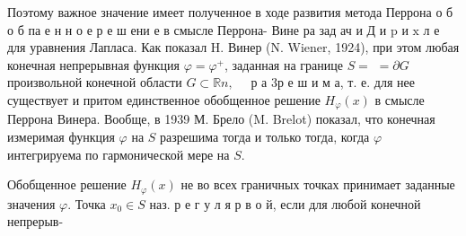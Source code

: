 \documentclass[10pt]{article}
\begin{document}
Поэтому важное значение имеет полученное в ходе развития метода Перрона о б о б па е н н о е р е ш ени е в смысле Перрона- Вине ра зад ач и Д и $\mathrm{p}$ и $\mathrm{x}$ л е для уравнения Лапласа. Как показал H. Винер (N. Wiener, 1924), при этом любая конечная непрерывная функция $\varphi=\varphi^{+}$, заданная на границе $S=$ $=\partial G$ произвольной конечной области $G \subset \mathbb{R} n, \quad$ р а 3р е ш и м а, т. е. для нее существует и притом единственное обобщенное решение $H_{\varphi}(x)$ в смысле Перрона Винера. Вообще, в 1939 М. Брело (M. Brelot) показал, что конечная измеримая функция $\varphi$ на $S$ разрешима тогда и только тогда, когда $\varphi$ интегрируема по гармонической мере на $S$.



Обобщенное решение $H_{\varphi}(x)$ не во всех граничных точках принимает заданные значения $\varphi$. Точка $x_{0} \in S$ наз. р е г у л я р в о й, если для любой конечной непрерыв-
\end{document}
